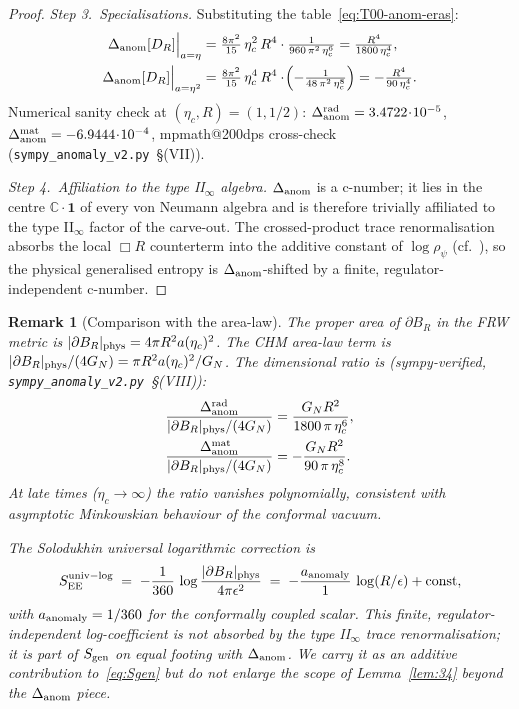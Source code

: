\documentclass[11pt]{article}
\newtheorem{remark}[lemma]{Remark}
\begin{document}
\begin{proof}
\smallskip
\emph{Step 3.\ Specialisations.}  Substituting the table~\eqref{eq:T00-anom-eras}:
\begin{align*}
   \Delta_{\rm anom}[D_R]\Big|_{a=\eta}
   &=\tfrac{8\pi^2}{15}\,\eta_c^2\,R^4\cdot
        \tfrac{1}{960\,\pi^2\,\eta_c^{6}}
   =\tfrac{R^4}{1800\,\eta_c^{4}},\\
   \Delta_{\rm anom}[D_R]\Big|_{a=\eta^2}
   &=\tfrac{8\pi^2}{15}\,\eta_c^4\,R^4\cdot
        \!\left(-\tfrac{1}{48\,\pi^2\,\eta_c^{8}}\right)
   =-\tfrac{R^4}{90\,\eta_c^{4}}.
\end{align*}
Numerical sanity check at $(\eta_c,R)=(1,1/2)$: $\Delta_{\rm anom}^{\rm rad}
=3.4722\!\cdot\!10^{-5}$, $\Delta_{\rm anom}^{\rm mat}=-6.9444\!\cdot\!10^{-4}$,
mpmath@200dps cross-check (\texttt{sympy\_anomaly\_v2.py}~\S(VII)).

\smallskip
\emph{Step 4.\ Affiliation to the type II$_\infty$ algebra.}
$\Delta_{\rm anom}$ is a c-number; it lies in the centre
$\mathbb{C}\!\cdot\!\mathbf{1}$ of every von Neumann algebra and is
therefore trivially affiliated to the type II$_\infty$ factor of the
carve-out.  The crossed-product trace renormalisation absorbs the local
$\Box R$ counterterm into the additive constant of $\log\rho_\psi$
(cf.~\cite[\S2.3]{Witten2021}), so the physical generalised entropy is
$\Delta_{\rm anom}$-shifted by a finite, regulator-independent c-number.
\end{proof}

\begin{remark}[Comparison with the area-law]\label{rem:area}
The proper area of $\partial B_R$ in the FRW metric is
$|\partial B_R|_{\rm phys}=4\pi R^2 a(\eta_c)^2$.  The CHM
area-law term \cite{CasiniHuertaMyers2011} is
$|\partial B_R|_{\rm phys}/(4G_N)=\pi R^2 a(\eta_c)^2/G_N$.  The
dimensional ratio is (sympy-verified, \texttt{sympy\_anomaly\_v2.py}~\S(VIII)):
\begin{align*}
   \frac{\Delta_{\rm anom}^{\rm rad}}{|\partial B_R|_{\rm phys}/(4G_N)}
   &=\frac{G_N R^2}{1800\,\pi\,\eta_c^{6}},\\
   \frac{\Delta_{\rm anom}^{\rm mat}}{|\partial B_R|_{\rm phys}/(4G_N)}
   &=-\frac{G_N R^2}{90\,\pi\,\eta_c^{8}}.
\end{align*}
At late times ($\eta_c\to\infty$) the ratio vanishes polynomially,
consistent with asymptotic Minkowskian behaviour of the conformal
vacuum.

The Solodukhin universal logarithmic correction
\cite[eq.~(5.55)]{Solodukhin2011} is
\begin{equation}
   S_{\rm EE}^{\rm univ-log}
   \;=\;-\frac{1}{360}\,\log\frac{|\partial B_R|_{\rm phys}}{4\pi\epsilon^2}
   \;=\;-\frac{a_{\rm anomaly}}{1}\,\log(R/\epsilon)+\text{const},
   \label{eq:solod-log}
\end{equation}
with $a_{\rm anomaly}=1/360$ for the conformally coupled scalar.  This
finite, regulator-independent log-coefficient is \emph{not} absorbed by
the type II$_\infty$ trace renormalisation; it is part of $S_{\rm gen}$
on equal footing with $\Delta_{\rm anom}$.  We carry it as an additive
contribution to~\eqref{eq:Sgen} but do not enlarge the scope of
Lemma~\ref{lem:34} beyond the $\Delta_{\rm anom}$ piece.
\end{remark}
\end{document}
